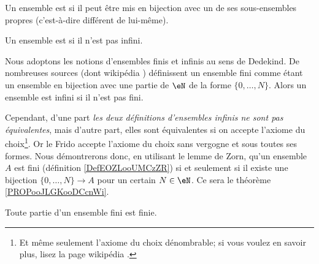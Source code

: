 \begin{definition}      \label{DefEOZLooUMCzZR}
	Un ensemble est  si il peut être mis en bijection avec un de ses sous-ensembles propres (c'est-à-dire différent de lui-même).

	Un ensemble est  si il n'est pas infini.
\end{definition}

\begin{normaltext}\label{NORooQuelleDefEnsInfini}
	Nous adoptons les notions d'ensembles finis et infinis au sens de Dedekind. De nombreuses sources (dont wikipédia \cite{BIBooJYONooLCnCtQ,BIBooPARTooZDteDq}) définissent un ensemble fini comme étant un ensemble en bijection avec une partie de \( \eN\) de la forme \( \{ 0,\ldots, N \}\). Alors un ensemble est infini si il n'est pas fini.

	Cependant, d'une part \emph{les deux définitions d'ensembles infinis ne sont pas équivalentes}, mais d'autre part, elles sont équivalentes si on accepte l'axiome du choix\footnote{Et même seulement l'axiome du choix dénombrable; si vous voulez en savoir plus, lisez la page wikipédia \cite{BIBooSPDRooHTpBqh}.}. Or le Frido accepte l'axiome du choix sans vergogne et sous toutes ses formes. Nous démontrerons donc, en utilisant le lemme de Zorn, qu'un ensemble \( A\) est fini (définition \ref{DefEOZLooUMCzZR}) si et seulement si il existe une bijection \( \{ 0,\ldots, N \}\to A\) pour un certain \( N\in \eN\). Ce sera le théorème  \ref{PROPooJLGKooDCcnWi}.
\end{normaltext}


\begin{lemma}       \label{LEMooTUIRooEXjfDY}
	Toute partie d'un ensemble fini est finie.
\end{lemma}

